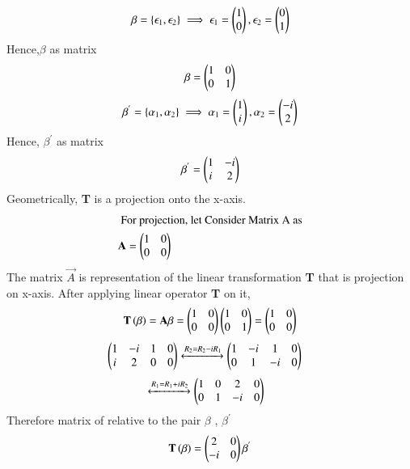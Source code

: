 \begin{align}
    \beta = \{\epsilon_1 , \epsilon_2\}\implies 
    \epsilon_1=\begin{pmatrix}1\\0\end{pmatrix},\epsilon_2=\begin{pmatrix}0\\1\end{pmatrix}
\end{align}
Hence,$\beta$ as  matrix 
\begin{align}
    \beta=\begin{pmatrix}1&0\\0&1\end{pmatrix}
\end{align}
\begin{align}
 \beta^{'}=\{\alpha_1 , \alpha_2\}\implies
  \alpha_1 = \begin{pmatrix}1\\i\end{pmatrix} , \alpha_2 = \begin{pmatrix}-i\\2\end{pmatrix}
  \end{align}
 Hence, $\beta^{'}$ as matrix 
  \begin{align}
     \beta^{'} =\begin{pmatrix}
     1&-i\\i&2
     \end{pmatrix}
  \end{align}
Geometrically, \textbf{T} is a projection onto the x-axis.
\begin{align}
\intertext{ For projection, let Consider Matrix A as} 
    {\mathbf{A}}=\begin{pmatrix}1&0\\0&0\end{pmatrix}
\end{align}
The matrix  $\vec{A}$ is representation  of the linear transformation \textbf{T} that is projection on x-axis.
After applying linear operator \textbf{T} on it,
\begin{multline}
\textbf{T}\left(\beta\right)  = \mathbf{A}\beta= \begin{pmatrix}1 & 0 \\ 0 & 0 \end{pmatrix}\begin{pmatrix}1 & 0 \\ 0 & 1\end{pmatrix}=\begin{pmatrix} 1 & 0\\ 0 & 0\end{pmatrix} \label{eq:solutions/3/4/1/a/2.1}
\end{multline}
 \begin{align}
    \begin{pmatrix}
    1&-i&1&0\\i&2&0&0
    \end{pmatrix}
    &\xleftrightarrow{R_2=R_2-i{R_1}}
    \begin{pmatrix}
    1&-i &1&0\\0&1&-i&0
    \end{pmatrix}
 \end{align}
  \begin{align}
    &\xleftrightarrow{R_1=R_1+i{R_2}}
    \begin{pmatrix}
    1&0 &2&0\\0&1&-i&0
    \end{pmatrix}
 \end{align}
 Therefore matrix of relative to the pair  $\beta$ , $\beta^{'}$
 \begin{align}
  \mathbf{T}\left(\mathbf{\beta}\right)=\begin{pmatrix}2&0\\-i&0\end{pmatrix}\mathbf{\beta^{'}}   
 \end{align}

